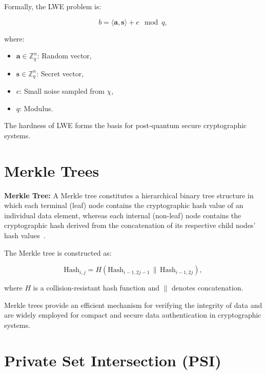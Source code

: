 Formally, the LWE problem is:

\begin{equation}\label{eq:lwe}
b = \langle \mathbf{a}, \mathbf{s} \rangle + e \mod q,
\end{equation}

where:
\begin{itemize}
    \item $\mathbf{a} \in \mathbb{Z}_q^n$: Random vector,
    \item $\mathbf{s} \in \mathbb{Z}_q^n$: Secret vector,
    \item $e$: Small noise sampled from $\chi$,
    \item $q$: Modulus.
\end{itemize}

The hardness of LWE forms the basis for post-quantum secure cryptographic systems.

\section{Merkle Trees}

\begin{definition}\label{def:merkle}
\textbf{Merkle Tree:} A Merkle tree constitutes a hierarchical binary tree structure in which each terminal (leaf) node contains the cryptographic hash value of an individual data element, whereas each internal (non-leaf) node contains the cryptographic hash derived from the concatenation of its respective child nodes' hash values~\cite{merkle1987digital}.
\end{definition}

The Merkle tree is constructed as:

\begin{equation}\label{eq:merkle}
\text{Hash}_{i,j} = H(\text{Hash}_{i-1,2j-1} \,\|\, \text{Hash}_{i-1,2j}),
\end{equation}

where $H$ is a collision-resistant hash function and $\|$ denotes concatenation.

\begin{remark}
Merkle trees provide an efficient mechanism for verifying the integrity of data and are widely employed for compact and secure data authentication in cryptographic systems.
\end{remark}

\section{Private Set Intersection (PSI)}

